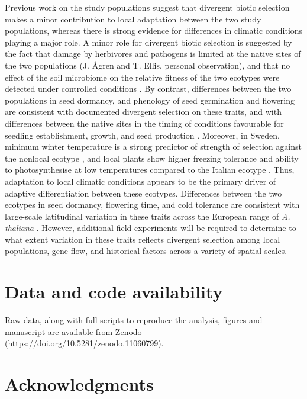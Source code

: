 \documentclass[twocolumn,twoside,lettersize]{article}
\begin{document}
Previous work on the study populations suggest that divergent biotic selection makes a minor contribution to local adaptation between the two study populations, whereas there is strong evidence for differences in climatic conditions playing a major role. A minor role for divergent biotic selection is suggested by the fact that damage by herbivores and pathogens is limited at the native sites of the two populations (J. {\AA}gren and T. Ellis, personal observation), and that no effect of the soil microbiome on the relative fitness of the two ecotypes were detected under controlled conditions \cite{Duran2022-ha}. By contrast, differences between the two populations in seed dormancy, and phenology of seed germination and flowering are consistent with documented divergent selection on these traits, and with differences between the native sites in the timing of conditions favourable for seedling establishment, growth, and seed production \cite{Agren2017-ea, Postma2016-jj, Postma2018-ie}. Moreover, in Sweden, minimum winter temperature is a strong predictor of strength of selection against the nonlocal ecotype \cite{Agren2012-ga}, and local plants show higher freezing tolerance and ability to photosynthesise at low temperatures compared to the Italian ecotype \cite{Oakley2014-td, Oakley2018-eb, Lee2024-up}. Thus, adaptation to local climatic conditions appears to be the primary driver of adaptive differentiation between these ecotypes. Differences between the two ecotypes in seed dormancy, flowering time, and cold tolerance are consistent with large-scale latitudinal variation in these traits across the European range of \textit{A. thaliana} \cite{Debieu2013-nf, Martinez-Berdeja2020-fg, Stinchcombe2004-ig, Zacchello2022-xa, Zhen2008-fz}. However, additional field experiments will be required to determine to what extent variation in these traits reflects divergent selection among local populations, gene flow, and historical factors across a variety of spatial scales. 

\section*{Data and code availability}

Raw data, along with full scripts to reproduce the analysis, figures and manuscript are available from Zenodo (\url{https://doi.org/10.5281/zenodo.11060799}).

\section*{Acknowledgments}
\end{document}
